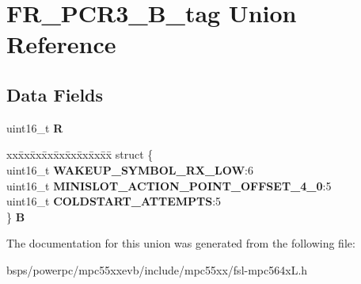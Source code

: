 \hypertarget{unionFR__PCR3__16B__tag}{}\section{F\+R\+\_\+\+P\+C\+R3\+\_\+B\+\_\+tag Union Reference}
\label{unionFR__PCR3__16B__tag}
\subsection*{Data Fields}
\begin{DoxyCompactItemize}
\item 
\mbox{\label{unionFR__PCR3__16B__tag_a6a4fbb4ad503fa6608dbd3bb06fd3996}} 
uint16\+\_\+t {\bfseries R}
\item 
\mbox{\label{unionFR__PCR3__16B__tag_a451dbd0e09c20980389cf8282d4a8687}} 
\begin{tabbing}
xx\=xx\=xx\=xx\=xx\=xx\=xx\=xx\=xx\=\kill
struct \{\\
\>uint16\_t {\bfseries WAKEUP\_SYMBOL\_RX\_LOW}:6\\
\>uint16\_t {\bfseries MINISLOT\_ACTION\_POINT\_OFFSET\_4\_0}:5\\
\>uint16\_t {\bfseries COLDSTART\_ATTEMPTS}:5\\
\} {\bfseries B}\\

\end{tabbing}\end{DoxyCompactItemize}


The documentation for this union was generated from the following file\+:\begin{DoxyCompactItemize}
\item 
bsps/powerpc/mpc55xxevb/include/mpc55xx/fsl-\/mpc564x\+L.\+h\end{DoxyCompactItemize}
